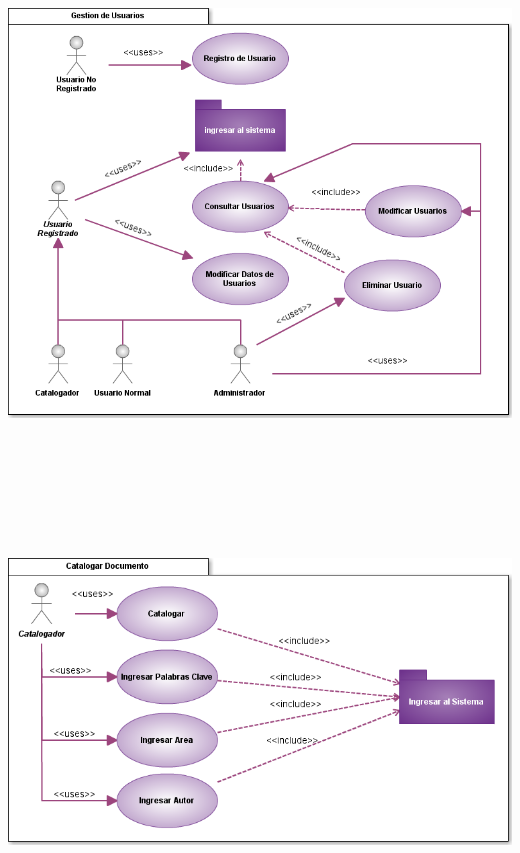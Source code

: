\documentclass[11pt]{article}
\begin{document}
        \begin{minipage}[c]{1\linewidth}
                \centering
                \includegraphics[scale=.6]{casosUso/CUGestionUsuarios}
        \end{minipage}     
        
        \begin{minipage}[c]{1\linewidth}
                \centering
                \includegraphics[width=16cm, height=14cm]{casosUso/CUCatalogar}
        \end{minipage}\\[5cm]
        
\end{document}

